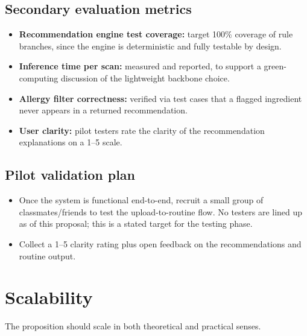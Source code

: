 \documentclass[11pt,a4paper]{article}
\begin{document}
\subsection{Secondary evaluation metrics}
\begin{itemize}[leftmargin=0.7cm]
    \item \textbf{Recommendation engine test coverage:} target 100\% coverage of rule branches, since the engine is deterministic and fully testable by design.
    \item \textbf{Inference time per scan:} measured and reported, to support a green-computing discussion of the lightweight backbone choice.
    \item \textbf{Allergy filter correctness:} verified via test cases that a flagged ingredient never appears in a returned recommendation.
    \item \textbf{User clarity:} pilot testers rate the clarity of the recommendation explanations on a 1--5 scale.
\end{itemize}

\subsection{Pilot validation plan}
\begin{itemize}[leftmargin=0.7cm]
    \item Once the system is functional end-to-end, recruit a small group of classmates/friends to test the upload-to-routine flow. No testers are lined up as of this proposal; this is a stated target for the testing phase.
    \item Collect a 1--5 clarity rating plus open feedback on the recommendations and routine output.
\end{itemize}

\section{Scalability}
The proposition should scale in both theoretical and
practical senses.
\end{document}
